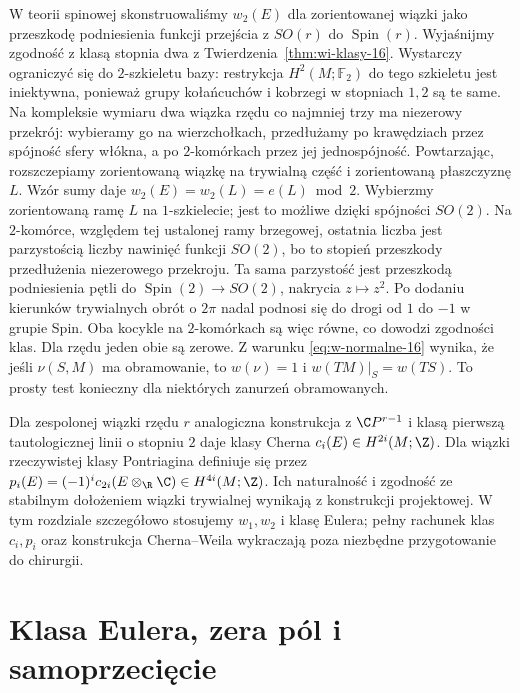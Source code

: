 \begin{uwaga}
W teorii spinowej
skonstruowaliśmy
$w_2(E)$ dla zorientowanej
wiązki jako przeszkodę
podniesienia funkcji
przejścia z $SO(r)$
do $\operatorname{Spin}(r)$.
Wyjaśnijmy zgodność z klasą stopnia dwa z
Twierdzenia~\ref{thm:wi-klasy-16}. Wystarczy ograniczyć
się do $2$-szkieletu bazy: restrykcja $H^2(M;\mathbb F_2)$
do tego szkieletu jest iniektywna, ponieważ grupy
kołańcuchów i kobrzegi w stopniach $1,2$ są te same.
Na kompleksie wymiaru dwa wiązka rzędu co najmniej trzy
ma niezerowy przekrój: wybieramy go na wierzchołkach,
przedłużamy po krawędziach przez spójność sfery włókna,
a po $2$-komórkach przez jej jednospójność.
Powtarzając, rozszczepiamy zorientowaną wiązkę na
trywialną część i zorientowaną płaszczyznę $L$.
Wzór sumy daje $w_2(E)=w_2(L)=e(L)\bmod2$.
Wybierzmy zorientowaną ramę $L$ na $1$-szkielecie;
jest to możliwe dzięki spójności $SO(2)$.
Na $2$-komórce, względem tej ustalonej ramy brzegowej,
ostatnia liczba jest parzystością liczby nawinięć
funkcji $SO(2)$, bo to
stopień przeszkody przedłużenia niezerowego przekroju.
Ta sama parzystość jest przeszkodą podniesienia pętli
do $\operatorname{Spin}(2)\to SO(2)$, nakrycia $z\mapsto z^2$.
Po dodaniu kierunków trywialnych obrót o $2\pi$
nadal podnosi się do drogi od $1$ do $-1$ w grupie Spin.
Oba kocykle na $2$-komórkach są więc równe,
co dowodzi zgodności klas. Dla rzędu jeden obie są zerowe.
Z warunku
\eqref{eq:w-normalne-16}
wynika, że jeśli
$\nu(S,M)$ ma obramowanie,
to $w(\nu)=1$ i
$w(TM)|_S=w(TS)$.
To prosty test konieczny
dla niektórych zanurzeń
obramowanych.
\end{uwaga}

\begin{uwaga}
Dla zespolonej wiązki
rzędu $r$ analogiczna
konstrukcja z
$\C P^{r-1}$
i klasą pierwszą
tautologicznej linii
o stopniu $2$
daje klasy Cherna
$c_i(E)\in H^{2i}(M;\Z)$.
Dla wiązki rzeczywistej
klasy Pontriagina
definiuje się przez
$p_i(E)=(-1)^i
c_{2i}(E\otimes_\R\C)
\in H^{4i}(M;\Z)$.
Ich naturalność i
zgodność ze stabilnym
dołożeniem wiązki
trywialnej wynikają
z konstrukcji projektowej.
W tym rozdziale
szczegółowo stosujemy
$w_1,w_2$ i klasę
Eulera; pełny rachunek
klas $c_i,p_i$
oraz konstrukcja
Cherna--Weila
wykraczają poza
niezbędne przygotowanie
do chirurgii.
\end{uwaga}

\section{Klasa Eulera, zera pól i samoprzecięcie}
\label{sec:klasy-eulera-16}

